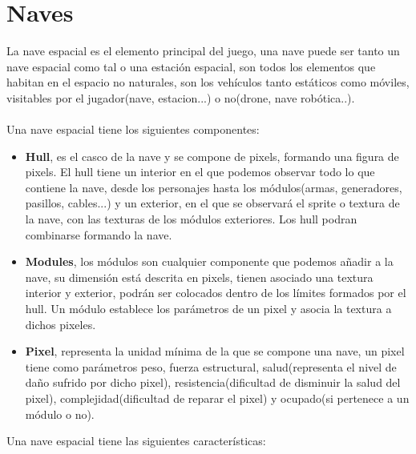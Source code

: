 \section{Naves}
La nave espacial es el elemento principal del juego, una nave puede ser tanto un nave espacial como tal o una estación espacial, son todos los elementos que habitan en el espacio no naturales, son los vehículos tanto estáticos como móviles, visitables por el jugador(nave, estacion...) o no(drone, nave robótica..). \\ \\
Una nave espacial tiene los siguientes componentes:
\begin{itemize}
\item \textbf{Hull}, es el casco de la nave y se compone de pixels, formando una figura de pixels. El hull tiene un interior en el que podemos observar todo lo que contiene la nave, desde los personajes hasta los módulos(armas, generadores, pasillos, cables...) y un exterior, en el que se observará el sprite o textura de la nave, con las texturas de los módulos exteriores. Los hull podran combinarse formando la nave.
\item \textbf{Modules}, los módulos son cualquier componente que podemos añadir a la nave, su dimensión está descrita en pixels, tienen asociado una textura interior y exterior, podrán ser colocados dentro de los límites formados por el hull. Un módulo establece los parámetros de un pixel y asocia la textura a dichos pixeles.
\item \textbf{Pixel}, representa la unidad mínima de la que se compone una nave, un pixel tiene como parámetros peso, fuerza estructural, salud(representa el nivel de daño sufrido por dicho pixel), resistencia(dificultad de disminuir la salud del pixel), complejidad(dificultad de reparar el pixel) y ocupado(si pertenece a un módulo o no).
\end{itemize}
Una nave espacial tiene las siguientes características:
